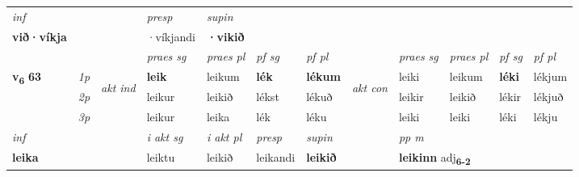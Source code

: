\begin{longtable}[l]{X>{\footnotesize\itshape}llXXXXlXXXX}
\cmidrule{4-7}
   {\textit{inf}} & &     & \textit{presp} & \textit{supin}   \\*
  {\textbf{við\allowbreak ·víkja}} & &     & ·víkjandi &  \textbf{·vikið}   \\*

\midrule

 & &   & \textit{praes sg}  & \textit{praes pl}    & \textit{ pf sg} & \textit{pf pl} & & \textit{praes sg}  & \textit{praes pl}    & \textit{pf sg} & \textit{pf pl }  \\ \cmidrule{4-7} \cmidrule{9-12}
 \multirow{2}{*}{{{\textbf{v{\textsubscript{6}}} \Large{\textbf{63}}}}}  & 1p & \multirow{3}{*}{\begin{turn}{90}\textit{akt ind}\end{turn}} & \textbf{leik} & leikum & \textbf{lék} & \textbf{lékum} & \multirow{3}{*}{\begin{turn}{90}\textit{akt con}\end{turn}} &leiki & leikum & \textbf{léki} & lékjum\\*
 & 2p &  &  leikur  & leikið & lékst & lékuð & & leikir & leikið & lékir & lékjuð \\*
 & 3p &  & leikur & leika & lék & léku & & leiki & leiki& léki & lékju \\*
\cmidrule{4-7} \cmidrule{9-12}

   {\textit{inf}} & &  & \textit{i akt sg} & \textit{i akt pl}   & \textit{presp} & \textit{supin}  && \textit{pp m} \\*
  {\textbf{leika}} & && leiktu  & leikið   & leikandi &  \textbf{leikið}  && \multicolumn{2}{l}{\textbf{leikinn} adj\textbf{\textsubscript{6-2}}} \\*

\midrule


\end{longtable}
